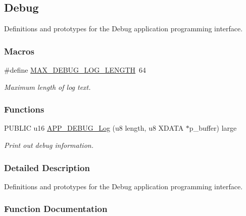 \hypertarget{group___d_e_b_u_g}{}\subsection{Debug}
\label{group___d_e_b_u_g}


Definitions and prototypes for the Debug application programming interface.  


\subsubsection*{Macros}
\begin{DoxyCompactItemize}
\item 
\#define \hyperlink{group___d_e_b_u_g_gabb8054bf4e67d91ba884ed87f28500c0}{M\+A\+X\+\_\+\+D\+E\+B\+U\+G\+\_\+\+L\+O\+G\+\_\+\+L\+E\+N\+G\+TH}~64\hypertarget{group___d_e_b_u_g_gabb8054bf4e67d91ba884ed87f28500c0}{}\label{group___d_e_b_u_g_gabb8054bf4e67d91ba884ed87f28500c0}

\begin{DoxyCompactList}\small\item\em Maximum length of log text. \end{DoxyCompactList}\end{DoxyCompactItemize}
\subsubsection*{Functions}
\begin{DoxyCompactItemize}
\item 
P\+U\+B\+L\+IC u16 \hyperlink{group___d_e_b_u_g_ga9ab431d998047e972ffb304e669f8581}{A\+P\+P\+\_\+\+D\+E\+B\+U\+G\+\_\+\+Log} (u8 length, u8 X\+D\+A\+TA $\ast$p\+\_\+buffer) large
\begin{DoxyCompactList}\small\item\em Print out debug information. \end{DoxyCompactList}\end{DoxyCompactItemize}


\subsubsection{Detailed Description}
Definitions and prototypes for the Debug application programming interface. 



\subsubsection{Function Documentation}
